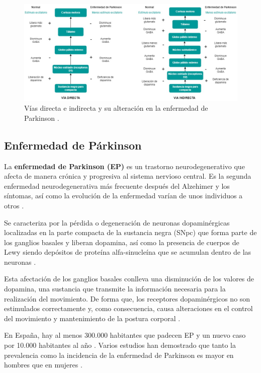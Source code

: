 
\begin{figure}[ht]
    \centering
    \includegraphics[width=1\textwidth]{img/Diagrama_ganglios.jpg}
    \caption{Vías directa e indirecta y su alteración en la enfermedad de Parkinson \cite{marin2018enfermedad}.}
    \label{fig:ganglios-vias}
\end{figure}


\subsection{Enfermedad de Párkinson}

La \textbf{enfermedad de Parkinson (EP)} es un trastorno neurodegenerativo que afecta de manera crónica y progresiva al sistema nervioso central. Es la segunda enfermedad neurodegenerativa más frecuente después del Alzehimer y los síntomas, así como la evolución de la enfermedad varían de unos individuos a otros \cite{MARTINEZFERNANDEZ2016363}.  

Se caracteriza por la pérdida o degeneración de neuronas dopaminérgicas localizadas en la parte compacta de la sustancia negra (SNpc) que forma parte de los ganglios basales y liberan dopamina, así como la presencia de cuerpos de Lewy siendo depósitos de proteína alfa-sinucleína que se acumulan dentro de las neuronas \cite{ayala2007enfermedad, gomez2012mecanismos, MARTINEZFERNANDEZ2016363}.  

 Esta afectación de los ganglios basales conlleva una disminución de los valores de dopamina, una sustancia que transmite la información necesaria para la realización del movimiento. De forma que, los receptores dopaminérgicos no son estimulados correctamente y, como consecuencia, causa alteraciones en el control del movimiento y mantenimiento de la postura corporal \cite{ayala2007enfermedad}.

 En España, hay al menos 300.000 habitantes que padecen EP y un nuevo caso por 10.000 habitantes al año \cite{GARCIARAMOS2016401}. Varios estudios han demostrado que tanto la prevalencia como la incidencia de la enfermedad de Parkinson es mayor en hombres que en mujeres \cite{MARTINEZFERNANDEZ2016363}.



